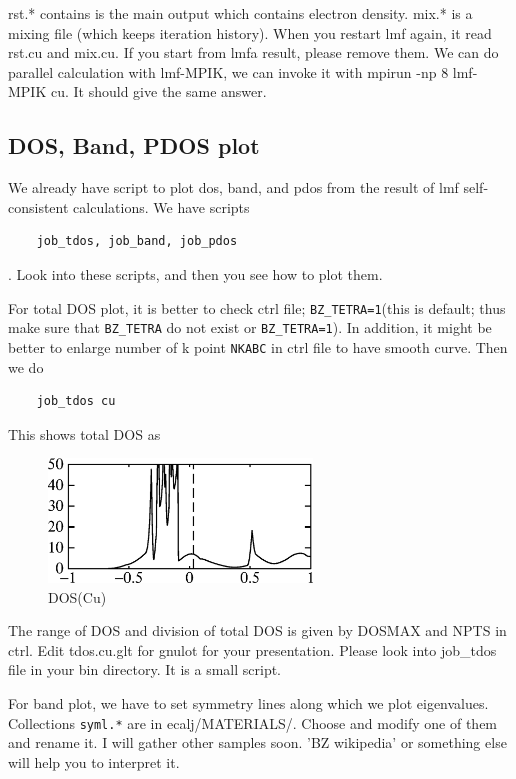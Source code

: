 \documentclass[a4paper,10pt,epsf,fleqn]{article}
\newcommand{\io}[1]{{\sf  #1}}
\begin{document}
rst.* contains is the main output which contains electron density.
mix.* is a mixing file (which keeps iteration history).
When you restart lmf again, it read rst.cu and mix.cu.
If you start from lmfa result, please remove them.
We can do parallel calculation with lmf-MPIK, 
we can invoke it with mpirun -np 8 lmf-MPIK cu. It should give the
same answer.



\subsection{DOS, Band, PDOS plot}

We already have script to plot dos, band, and pdos
from the result of lmf self-consistent calculations.
We have scripts
\begin{verbatim}
    job_tdos, job_band, job_pdos
\end{verbatim}
. Look into these scripts, and then you see how to plot them.

For total DOS plot, it is better to check ctrl file;
\verb+BZ_TETRA=1+(this is default; thus make sure that \verb+BZ_TETRA+ do
not exist or \verb+BZ_TETRA=1+). 
In addition, it might be better to enlarge number of k point
\verb+NKABC+ in ctrl file to have smooth curve. Then we do
\begin{verbatim}
    job_tdos cu
\end{verbatim}
This shows total DOS as
\begin{figure}[h]
 \begin{center}
  \includegraphics[width=70mm]{img/doscu.eps}
  \vspace{5mm}
  \caption{DOS(Cu)}
 \end{center}
\end{figure}
The range of DOS and division of total DOS is given by
DOSMAX and NPTS in ctrl. Edit tdos.cu.glt for gnulot for your presentation. 
Please look into \io{job\_tdos} file in your bin directory. It is a small script.

For band plot, we have to set symmetry lines along which we plot eigenvalues.
Collections \verb+syml.*+ are in ecalj/MATERIALS/. 
Choose and modify one of them and rename it. 
I will gather other samples soon. 'BZ wikipedia' or something else
will help you to interpret it.
\end{document}
